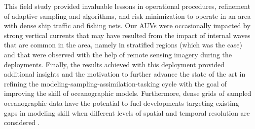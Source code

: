 This field study provided invaluable lessons in operational procedures,
refinement of adaptive sampling and algorithms, and risk minimization to
operate in an area with dense ship traffic and fishing nets. Our AUVs
were occasionally impacted by strong vertical currents that may have
resulted from the impact of internal waves that are common in the area,
namely in stratified regions (which was the case) and that were observed
with the help of remote sensing imagery during the deployments. Finally,
the results achieved with this deployment provided additional insights
and the motivation to further advance the state of the art in refining
the modeling-sampling-assimilation-tasking cycle with the goal of
improving the skill of oceanographic models. Furthermore, dense grids of
sampled oceanographic data have the potential to fuel developments
targeting existing gaps in modeling skill when different levels of
spatial and temporal resolution are considered \cite{Balaji_2022}.
